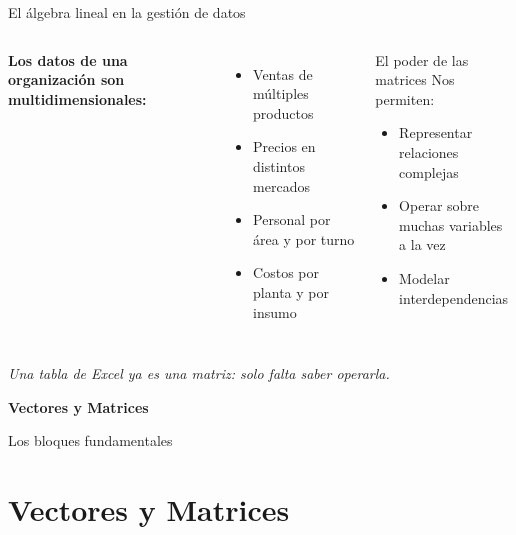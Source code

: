 \documentclass[aspectratio=169,10pt]{beamer}
\begin{document}
\begin{frame}{El álgebra lineal en la gestión de datos}

\begin{columns}[T]
\textbf{Los datos de una organización son multidimensionales:}
\begin{itemize}
    \item Ventas de múltiples productos
    \item Precios en distintos mercados
    \item Personal por área y por turno
    \item Costos por planta y por insumo
\end{itemize}

\begin{alertblock}{El poder de las matrices}
Nos permiten:
\begin{itemize}
    \item Representar relaciones complejas
    \item Operar sobre muchas variables a la vez
    \item Modelar interdependencias
\end{itemize}
\end{alertblock}
\end{columns}

\vspace{0.5cm}
\begin{center}
\textit{Una tabla de Excel ya es una matriz: solo falta saber operarla.}
\end{center}
\end{frame}

\begin{frame}
\begin{center}
\vspace{1.5cm}
\Huge \textbf{Vectores y Matrices}

\vspace{0.5cm}
\Large Los bloques fundamentales
\end{center}
\end{frame}

\section{Vectores y Matrices}
\end{document}
